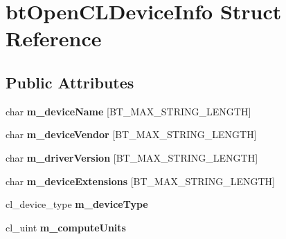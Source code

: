 \hypertarget{structbt_open_c_l_device_info}{\section{bt\+Open\+C\+L\+Device\+Info Struct Reference}
\label{structbt_open_c_l_device_info}
}
\subsection*{Public Attributes}
\begin{DoxyCompactItemize}
\item 
\hypertarget{structbt_open_c_l_device_info_a90cd1e2ff29067c46f44e37c13a83bee}{char {\bfseries m\+\_\+device\+Name} \mbox{[}B\+T\+\_\+\+M\+A\+X\+\_\+\+S\+T\+R\+I\+N\+G\+\_\+\+L\+E\+N\+G\+T\+H\mbox{]}}\label{structbt_open_c_l_device_info_a90cd1e2ff29067c46f44e37c13a83bee}

\item 
\hypertarget{structbt_open_c_l_device_info_a061cc6f1a776998471ad972ce47dca07}{char {\bfseries m\+\_\+device\+Vendor} \mbox{[}B\+T\+\_\+\+M\+A\+X\+\_\+\+S\+T\+R\+I\+N\+G\+\_\+\+L\+E\+N\+G\+T\+H\mbox{]}}\label{structbt_open_c_l_device_info_a061cc6f1a776998471ad972ce47dca07}

\item 
\hypertarget{structbt_open_c_l_device_info_ae6a139a736e0ed161e7f74583a48258a}{char {\bfseries m\+\_\+driver\+Version} \mbox{[}B\+T\+\_\+\+M\+A\+X\+\_\+\+S\+T\+R\+I\+N\+G\+\_\+\+L\+E\+N\+G\+T\+H\mbox{]}}\label{structbt_open_c_l_device_info_ae6a139a736e0ed161e7f74583a48258a}

\item 
\hypertarget{structbt_open_c_l_device_info_a159d55c25b38180b6b570161477ff12d}{char {\bfseries m\+\_\+device\+Extensions} \mbox{[}B\+T\+\_\+\+M\+A\+X\+\_\+\+S\+T\+R\+I\+N\+G\+\_\+\+L\+E\+N\+G\+T\+H\mbox{]}}\label{structbt_open_c_l_device_info_a159d55c25b38180b6b570161477ff12d}

\item 
\hypertarget{structbt_open_c_l_device_info_a233c5e1c115dcd74d3eeb56e57a99a60}{cl\+\_\+device\+\_\+type {\bfseries m\+\_\+device\+Type}}\label{structbt_open_c_l_device_info_a233c5e1c115dcd74d3eeb56e57a99a60}

\item 
\hypertarget{structbt_open_c_l_device_info_a00875c9c28d2ed26280221d37a5d3479}{cl\+\_\+uint {\bfseries m\+\_\+compute\+Units}}\label{structbt_open_c_l_device_info_a00875c9c28d2ed26280221d37a5d3479}


\end{DoxyCompactItemize}
